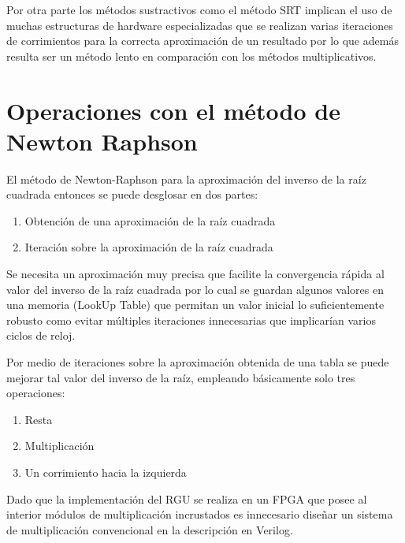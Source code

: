 Por otra parte los métodos sustractivos como el método SRT implican el uso de muchas estructuras de hardware especializadas que se realizan varias iteraciones de corrimientos para la correcta aproximación de un resultado por lo que además resulta ser un método lento en comparación con los métodos multiplicativos.

\section{Operaciones con el método de Newton Raphson}

El método de Newton-Raphson para la aproximación del inverso de la raíz cuadrada entonces se puede desglosar en dos partes: 

\begin{enumerate}

\item Obtención de una aproximación de la raíz cuadrada

\item Iteración sobre la aproximación de la raíz cuadrada

\end{enumerate}  
  
Se necesita un aproximación muy precisa que facilite la convergencia rápida al valor del inverso de la raíz cuadrada  por lo cual se guardan algunos valores en una memoria (LookUp Table) que permitan un valor inicial lo suficientemente robusto como evitar múltiples iteraciones innecesarias que implicarían varios ciclos de reloj. 
  
Por medio de iteraciones sobre la aproximación obtenida de una tabla se puede mejorar tal valor del inverso de la raíz, empleando básicamente solo tres operaciones:

\begin{enumerate}

\item Resta

\item Multiplicación

\item Un corrimiento hacia la izquierda

\end{enumerate} 

Dado que la implementación del RGU se realiza en un FPGA que posee al interior módulos de multiplicación incrustados es innecesario diseñar un sistema de multiplicación convencional en la descripción en Verilog.

